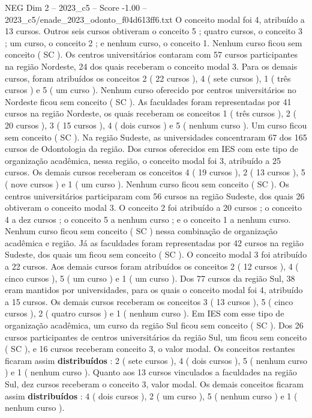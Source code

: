 \begin{textsample}{NEG Dim 2 – 2023\_c5 – Score -1.00 – 2023\_c5/enade\_2023\_odonto\_f04d613ff6.txt}
O conceito modal foi 4, atribuído a 13 cursos.
Outros seis cursos obtiveram o conceito 5 ; quatro cursos, o conceito 3 ; um curso, o conceito 2 ; e nenhum curso, o conceito 1.
Nenhum curso ficou sem conceito ( SC ).
Os centros universitários contaram com 57 cursos participantes na região Nordeste, 24 dos quais receberam o conceito modal 3.
Para os demais cursos, foram atribuídos os conceitos 2 ( 22 cursos ), 4 ( sete cursos ), 1 ( três cursos ) e 5 ( um curso ).
Nenhum curso oferecido por centros universitários no Nordeste ficou sem conceito ( SC ).
As faculdades foram representadas por 41 cursos na região Nordeste, os quais receberam os conceitos 1 ( três cursos ), 2 ( 20 cursos ), 3 ( 15 cursos ), 4 ( dois cursos ) e 5 ( nenhum curso ).
Um curso ficou sem conceito ( SC ).
Na região Sudeste, as universidades concentraram 67 dos 165 cursos de Odontologia da região.
Dos cursos oferecidos em IES com este tipo de organização acadêmica, nessa região, o conceito modal foi 3, atribuído a 25 cursos.
Os demais cursos receberam os conceitos 4 ( 19 cursos ), 2 ( 13 cursos ), 5 ( nove cursos ) e 1 ( um curso ).
Nenhum curso ficou sem conceito ( SC ).
Os centros universitários participaram com 56 cursos na região Sudeste, dos quais 26 obtiveram o conceito modal 3.
O conceito 2 foi atribuído a 20 cursos ; o conceito 4 a dez cursos ; o conceito 5 a nenhum curso ; e o conceito 1 a nenhum curso.
Nenhum curso ficou sem conceito ( SC ) nessa combinação de organização acadêmica e região.
Já as faculdades foram representadas por 42 cursos na região Sudeste, dos quais um ficou sem conceito ( SC ).
O conceito modal 3 foi atribuído a 22 cursos.
Aos demais cursos foram atribuídos os conceitos 2 ( 12 cursos ), 4 ( cinco cursos ), 5 ( um curso ) e 1 ( um curso ).
Dos 77 cursos da região Sul, 38 eram mantidos por universidades, para os quais o conceito modal foi 4, atribuído a 15 cursos.
Os demais cursos receberam os conceitos 3 ( 13 cursos ), 5 ( cinco cursos ), 2 ( quatro cursos ) e 1 ( nenhum curso ).
Em IES com esse tipo de organização acadêmica, um curso da região Sul ficou sem conceito ( SC ).
Dos 26 cursos participantes de centros universitários da região Sul, um ficou sem conceito ( SC ), e 16 cursos receberam conceito 3, o valor modal.
Os conceitos restantes ficaram assim \textbf{distribuídos} : 2 ( sete cursos ), 4 ( dois cursos ), 5 ( nenhum curso ) e 1 ( nenhum curso ).
Quanto aos 13 cursos vinculados a faculdades na região Sul, dez cursos receberam o conceito 3, valor modal.
Os demais conceitos ficaram assim \textbf{distribuídos} : 4 ( dois cursos ), 2 ( um curso ), 5 ( nenhum curso ) e 1 ( nenhum curso ).

\end{textsample}
